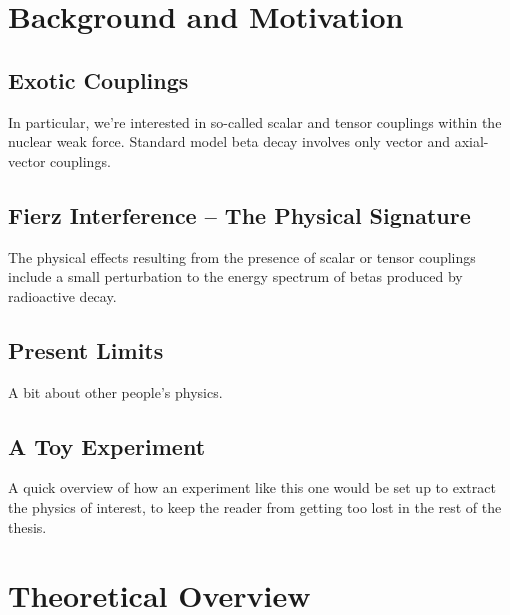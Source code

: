 


\clearpage

\chapter{Background and Motivation}
\label{background_chapter}

\section{Exotic Couplings}
	In particular, we're interested in so-called scalar and tensor couplings within the nuclear weak force. Standard model beta decay involves only vector and axial-vector couplings.
		
\section{Fierz Interference -- The Physical Signature}
	The physical effects resulting from the presence of scalar or tensor couplings include a small perturbation to the energy spectrum of betas produced by radioactive decay.  
		
\section{Present Limits}
	A bit about other people's physics.
	
\section{A Toy Experiment}
	A quick overview of how an experiment like this one would be set up to extract the physics of interest, to keep the reader from getting too lost in the rest of the thesis.


\clearpage
\chapter{Theoretical Overview}
\label{theory_chapter}

